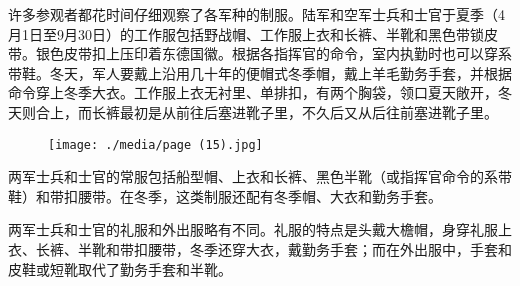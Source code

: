 许多参观者都花时间仔细观察了各军种的制服。陆军和空军士兵和士官于夏季（4月1日至9月30日）的工作服包括野战帽、工作服上衣和长裤、半靴和黑色带锁皮带。银色皮带扣上压印着东德国徽。根据各指挥官的命令，室内执勤时也可以穿系带鞋。冬天，军人要戴上沿用几十年的便帽式冬季帽，戴上羊毛勤务手套，并根据命令穿上冬季大衣。工作服上衣无衬里、单排扣，有两个胸袋，领口夏天敞开，冬天则合上，而长裤最初是从前往后塞进靴子里，不久后又从后往前塞进靴子里。

\begin{figure}
\texttt{[image: ./media/page (15).jpg]}
\end{figure}

两军士兵和士官的常服包括船型帽、上衣和长裤、黑色半靴（或指挥官命令的系带鞋）和带扣腰带。在冬季，这类制服还配有冬季帽、大衣和勤务手套。

两军士兵和士官的礼服和外出服略有不同。礼服的特点是头戴大檐帽，身穿礼服上衣、长裤、半靴和带扣腰带，冬季还穿大衣，戴勤务手套；而在外出服中，手套和皮鞋或短靴取代了勤务手套和半靴。

